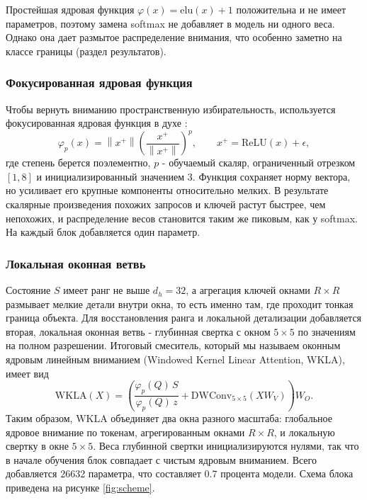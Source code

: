 \documentclass[a4paper,14pt]{article}
\numberwithin{figure}{section}
\numberwithin{table}{section}
\begin{document}
	Простейшая ядровая функция $\varphi(x) = \mathrm{elu}(x) + 1$ \cite{katharopoulos} положительна и не имеет параметров, поэтому замена softmax не добавляет
	в модель ни одного веса. Однако она дает размытое распределение внимания, что особенно заметно на классе границы (раздел результатов).

\subsubsection{Фокусированная ядровая функция}

	Чтобы вернуть вниманию пространственную избирательность, используется фокусированная ядровая функция в духе \cite{flatten}:
	$$
	\varphi_p(x) = \left\| x^{+} \right\| \left(\frac{x^{+}}{\left\| x^{+} \right\|}\right)^{p}, \qquad x^{+} = \mathrm{ReLU}(x) + \epsilon,
	$$
	где степень берется поэлементно, $p$ - обучаемый скаляр, ограниченный отрезком $[1, 8]$ и инициализированный значением 3. Функция сохраняет норму вектора,
	но усиливает его крупные компоненты относительно мелких. В результате скалярные произведения похожих запросов и ключей растут быстрее, чем непохожих,
	и распределение весов становится таким же пиковым, как у softmax. На каждый блок добавляется один параметр.

\subsubsection{Локальная оконная ветвь}

	Состояние $S$ имеет ранг не выше $d_h = 32$, а агрегация ключей окнами $R \times R$ размывает мелкие детали внутри окна, то есть именно там, где проходит тонкая
	граница объекта. Для восстановления ранга и локальной детализации добавляется вторая, локальная оконная ветвь - глубинная свертка с окном $5 \times 5$
	по значениям на полном разрешении. Итоговый смеситель, который мы называем оконным ядровым линейным вниманием (Windowed Kernel Linear Attention, WKLA),
	имеет вид
	$$
	\mathrm{WKLA}(X) = \left(\frac{\varphi_p(Q)\, S}{\varphi_p(Q)\, z} + \mathrm{DWConv}_{5 \times 5}\left(X W_V\right)\right) W_O.
	$$
	Таким образом, WKLA объединяет два окна разного масштаба: глобальное ядровое внимание по токенам, агрегированным окнами $R \times R$, и локальную свертку
	в окне $5 \times 5$. Веса глубинной свертки инициализируются нулями, так что в начале обучения блок совпадает с чистым ядровым вниманием. Всего добавляется
	26632 параметра, что составляет 0.7 процента модели. Схема блока приведена на рисунке \ref{fig:scheme}.
\end{document}
